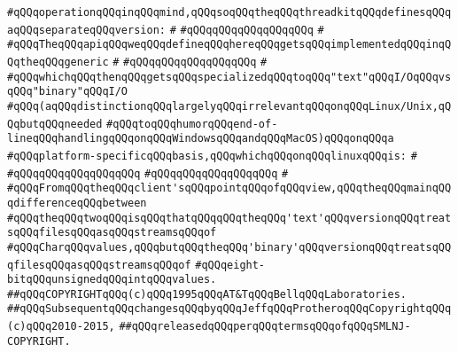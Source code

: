 \verb|#qQQqoperationqQQqinqQQqmind,qQQqsoqQQqtheqQQqthreadkitqQQqdefinesqQQqaqQQqseparateqQQqversion:|\newline
\verb|#|\newline
\verb|#qQQqqQQqqQQqqQQqqQQq|\newline
\verb|#|\newline
\verb|#qQQqTheqQQqapiqQQqweqQQqdefineqQQqhereqQQqgetsqQQqimplementedqQQqinqQQqtheqQQqgeneric|\newline
\verb|#|\newline
\verb|#qQQqqQQqqQQqqQQqqQQq|\newline
\verb|#|\newline
\verb|#qQQqwhichqQQqthenqQQqgetsqQQqspecializedqQQqtoqQQq"text"qQQqI/OqQQqvsqQQq"binary"qQQqI/O|\newline
\verb|#qQQq(aqQQqdistinctionqQQqlargelyqQQqirrelevantqQQqonqQQqLinux/Unix,qQQqbutqQQqneeded|\newline
\verb|#qQQqtoqQQqhumorqQQqend-of-lineqQQqhandlingqQQqonqQQqWindowsqQQqandqQQqMacOS)qQQqonqQQqa|\newline
\verb|#qQQqplatform-specificqQQqbasis,qQQqwhichqQQqonqQQqlinuxqQQqis:|\newline
\verb|#|\newline
\verb|#qQQqqQQqqQQqqQQqqQQq|\newline
\verb|#qQQqqQQqqQQqqQQqqQQq|\newline
\verb|#|\newline
\verb|#qQQqFromqQQqtheqQQqclient'sqQQqpointqQQqofqQQqview,qQQqtheqQQqmainqQQqdifferenceqQQqbetween|\newline
\verb|#qQQqtheqQQqtwoqQQqisqQQqthatqQQqqQQqtheqQQq'text'qQQqversionqQQqtreatsqQQqfilesqQQqasqQQqstreamsqQQqof|\newline
\verb|#qQQqCharqQQqvalues,qQQqbutqQQqtheqQQq'binary'qQQqversionqQQqtreatsqQQqfilesqQQqasqQQqstreamsqQQqof|\newline
\verb|#qQQqeight-bitqQQqunsignedqQQqintqQQqvalues.|\newline
\newline
\verb|##qQQqCOPYRIGHTqQQq(c)qQQq1995qQQqAT&TqQQqBellqQQqLaboratories.|\newline
\verb|##qQQqSubsequentqQQqchangesqQQqbyqQQqJeffqQQqProtheroqQQqCopyrightqQQq(c)qQQq2010-2015,|\newline
\verb|##qQQqreleasedqQQqperqQQqtermsqQQqofqQQqSMLNJ-COPYRIGHT.|\newline

